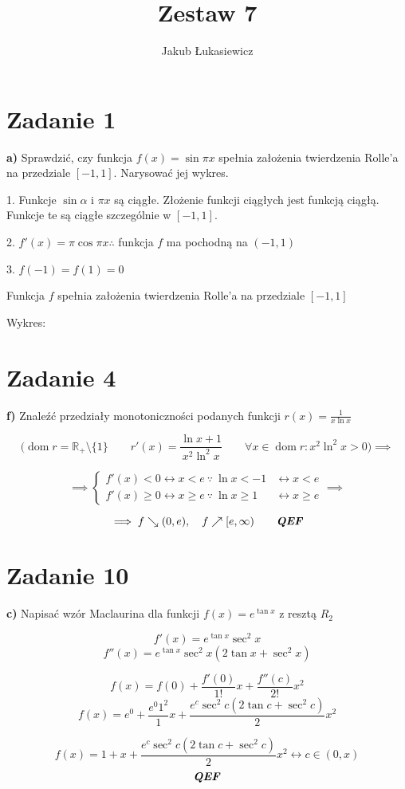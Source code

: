 \documentclass[12pt]{article}
\title{Zestaw 7}
\author{Jakub Łukasiewicz}
\date{}
\newcommand{\task}[1]{\section*{Zadanie #1}}
\newcommand{\ex}[1]{\textbf{ #1)}}
\newcommand{\qef}{\textbf{\textit{QEF}}}
\DeclareMathOperator{\dom}{dom}
\begin{document}
\maketitle

\task{1}\ex{a}
Sprawdzić, czy funkcja $f(x) = \sin{\pi x}$ spełnia założenia twierdzenia
Rolle'a na przedziale $[-1,1]$. Narysować jej wykres.

1. Funkcje $\sin{\alpha}$ i $\pi x$ są ciągłe. Złożenie funkcji ciągłych jest
funkcją ciągłą. Funkcje te są ciągłe szczególnie w $[-1,1]$.

2. $ f'(x) = \pi \cos{\pi x} \therefore $ funkcja $f$ ma pochodną na $(-1,1)$

3. $f(-1) = f(1) = 0$

Funkcja $f$ spełnia założenia twierdzenia Rolle'a na przedziale $[-1,1]$

Wykres:

\begin{figure}[h!]
    \centering
\end{figure}

\task{4}\ex{f}
Znaleźć przedziały monotoniczności podanych funkcji $r(x) = \frac{1}{x \ln{x}}$

$$ \Big( \dom{r} = \mathbb{R_+} \setminus \{1\} \qquad
r'(x) = \frac{\ln{x} + 1}{x^2 \ln^2{x}} \qquad
\forall{x \in \dom{r}} : x^2 \ln^2{x} > 0 \Big) \implies $$

$$
\implies
\left\{ \begin{array}{ll}
    f'(x) < 0   \leftrightarrow x < e   \ \because \ \ln{x} <  -1 &\leftrightarrow x < e   \\
    f'(x) \ge 0 \leftrightarrow x \ge e \ \because \ \ln{x} \ge 1 &\leftrightarrow x \ge e
\end{array} \right.
\implies
$$

$$ \implies f \searrow (0,e),\quad f \nearrow [e,\infty) \qquad\qef $$

\newpage

\task{10}\ex{c}
Napisać wzór Maclaurina dla funkcji $f(x) = e^{\tan{x}}$ z resztą $R_2$

$$ f'(x) = e^{\tan{x}} \sec^2{x} $$
$$ f''(x) = e^{\tan{x}} \sec^2{x} (2 \tan{x} + \sec^2{x}) $$

$$ f(x) = f(0) + \frac{f'(0)}{1!}x + \frac{f''(c)}{2!}x^2 $$
$$ f(x) = e^0 + \frac{e^0 1^2}{1}x + \frac{e^c \sec^2{c}(2 \tan{c} + \sec^2{c})}{2}x^2 $$

$$ f(x) = 1 + x + \frac{e^c \sec^2{c}(2 \tan{c} + \sec^2{c})}{2}x^2 \leftrightarrow c \in (0,x) $$
$$ \qef $$
\end{document}
